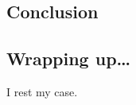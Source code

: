 \begin{partChapter}
\chapter{Conclusion}

\ifpdf
    \graphicspath{{colclusion/figures/PNG/}{colclusion/figures/PDF/}{colclusion/figures/}}
\else
    \graphicspath{{colclusion/figures/EPS/}{colclusion/figures/}}
\fi


\section{Wrapping up\ldots}
I rest my case.







\end{partChapter}
